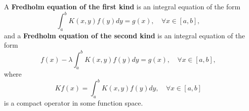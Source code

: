 \documentclass[12pt]{article}
\begin{document}
A \textbf{Fredholm equation of the first kind} is an integral equation of the form
\[
\int_{a}^{b} K(x,y) f(y) dy = g(x), \quad \forall x \in [a,b],
\]
and a \textbf{Fredholm equation of the second kind} is an integral equation of the form
\[
f(x) - \lambda\int_{a}^{b} K(x,y)f(y)dy = g(x), \quad \forall x \in [a, b],
\]
where
\[
Kf(x) = \int_{a}^{b} K(x,y)f(y)dy, \quad \forall x \in [a, b]
\]
is a compact operator in some function space.
\end{document}
